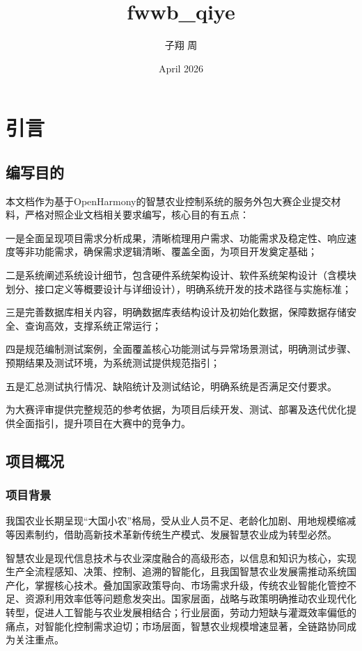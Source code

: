 \documentclass{article}
\title{fwwb\_qiye}
\author{子翔 周}
\date{April 2026}
\begin{document}
\maketitle

\newpage

\tableofcontents

\newpage

\section{引言}

\subsection{编写目的}

本文档作为基于OpenHarmony的智慧农业控制系统的服务外包大赛企业提交材料，严格对照企业文档相关要求编写，核心目的有五点：

一是全面呈现项目需求分析成果，清晰梳理用户需求、功能需求及稳定性、响应速度等非功能需求，确保需求逻辑清晰、覆盖全面，为项目开发奠定基础；

二是系统阐述系统设计细节，包含硬件系统架构设计、软件系统架构设计（含模块划分、接口定义等概要设计与详细设计），明确系统开发的技术路径与实施标准；

三是完善数据库相关内容，明确数据库表结构设计及初始化数据，保障数据存储安全、查询高效，支撑系统正常运行；

四是规范编制测试案例，全面覆盖核心功能测试与异常场景测试，明确测试步骤、预期结果及测试环境，为系统测试提供规范指引；

五是汇总测试执行情况、缺陷统计及测试结论，明确系统是否满足交付要求。

为大赛评审提供完整规范的参考依据，为项目后续开发、测试、部署及迭代优化提供全面指引，提升项目在大赛中的竞争力。

\subsection{项目概况}

\subsubsection{项目背景}

我国农业长期呈现“大国小农”格局，受从业人员不足、老龄化加剧、用地规模缩减等因素制约，借助高新技术革新传统生产模式、发展智慧农业成为转型必然。

智慧农业是现代信息技术与农业深度融合的高级形态，以信息和知识为核心，实现生产全流程感知、决策、控制、追溯的智能化，且我国智慧农业发展需推动系统国产化，掌握核心技术。叠加国家政策导向、市场需求升级，传统农业智能化管控不足、资源利用效率低等问题愈发突出。国家层面，战略与政策明确推动农业现代化转型，促进人工智能与农业发展相结合；行业层面，劳动力短缺与灌溉效率偏低的痛点，对智能化控制需求迫切；市场层面，智慧农业规模增速显著，全链路协同成为关注重点。
\end{document}
